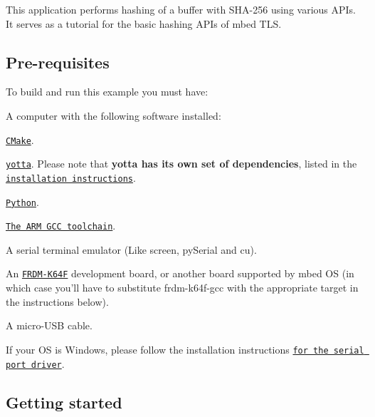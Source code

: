 This application performs hashing of a buffer with S\-H\-A-\/256 using various A\-P\-Is. It serves as a tutorial for the basic hashing A\-P\-Is of mbed T\-L\-S.

\subsection*{Pre-\/requisites}

To build and run this example you must have\-:
\begin{DoxyItemize}
\item A computer with the following software installed\-:
\begin{DoxyItemize}
\item \href{http://www.cmake.org/download/}{\tt C\-Make}.
\item \href{https://github.com/ARMmbed/yotta}{\tt yotta}. Please note that {\bfseries yotta has its own set of dependencies}, listed in the \href{http://armmbed.github.io/yotta/#installing-on-windows}{\tt installation instructions}.
\item \href{https://www.python.org/downloads/}{\tt Python}.
\item \href{https://launchpad.net/gcc-arm-embedded}{\tt The A\-R\-M G\-C\-C toolchain}.
\item A serial terminal emulator (Like screen, py\-Serial and cu).
\end{DoxyItemize}
\item An \href{http://developer.mbed.org/platforms/FRDM-K64F/}{\tt F\-R\-D\-M-\/\-K64\-F} development board, or another board supported by mbed O\-S (in which case you'll have to substitute frdm-\/k64f-\/gcc with the appropriate target in the instructions below).
\item A micro-\/\-U\-S\-B cable.
\item If your O\-S is Windows, please follow the installation instructions \href{https://developer.mbed.org/handbook/Windows-serial-configuration}{\tt for the serial port driver}.
\end{DoxyItemize}

\subsection*{Getting started}


